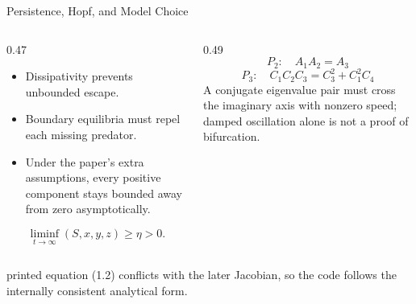 \begin{frame}{Persistence, Hopf, and Model Choice}
  \begin{columns}[T,onlytextwidth]
    \begin{column}{0.47\textwidth}
      \begin{itemize}
        \item Dissipativity prevents unbounded escape.
        \item Boundary equilibria must repel each missing predator.
        \item Under the paper's extra assumptions, every positive component
              stays bounded away from zero asymptotically.
      \end{itemize}
      \[
        \liminf_{t\to\infty}(S,x,y,z)\ge \eta>0.
      \]
    \end{column}
    \begin{column}{0.49\textwidth}
      \[
        P_2:\quad A_1A_2=A_3
      \]
      \[
        P_3:\quad C_1C_2C_3=C_3^2+C_1^2C_4
      \]
      A conjugate eigenvalue pair must cross the imaginary axis with nonzero
      speed; damped oscillation alone is not a proof of bifurcation.
    \end{column}
  \end{columns}
  \vspace{0.1cm}
   printed equation (1.2) conflicts with the
  later Jacobian, so the code follows the internally consistent analytical form.
\end{frame}
